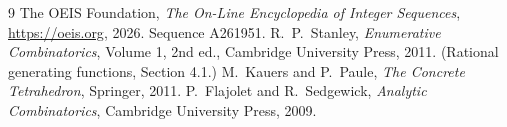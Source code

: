 \documentclass[11pt,a4paper]{article}
\theoremstyle{plain}
\theoremstyle{definition}
\begin{document}
\begin{thebibliography}{9}
 The OEIS Foundation, \emph{The On-Line Encyclopedia of Integer
Sequences}, \url{https://oeis.org}, 2026. Sequence A261951.
 R.~P.~Stanley, \emph{Enumerative Combinatorics}, Volume 1, 2nd ed.,
Cambridge University Press, 2011. (Rational generating functions, Section 4.1.)
 M.~Kauers and P.~Paule, \emph{The Concrete Tetrahedron}, Springer, 2011.
 P.~Flajolet and R.~Sedgewick, \emph{Analytic Combinatorics}, Cambridge
University Press, 2009.
\end{thebibliography}
\end{document}
